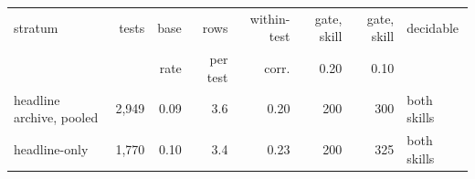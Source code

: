 \begin{tabular}{lrrrrrrl}
\toprule
stratum & tests & base & rows & within-test & gate, skill & gate, skill & decidable \\
 & & rate & per test & corr. & 0.20 & 0.10 &  \\
\midrule
headline archive, pooled & 2,949 & 0.09 & 3.6 & 0.20 & 200 & 300 & both skills \\
headline-only & 1,770 & 0.10 & 3.4 & 0.23 & 200 & 325 & both skills \\

\end{tabular}
